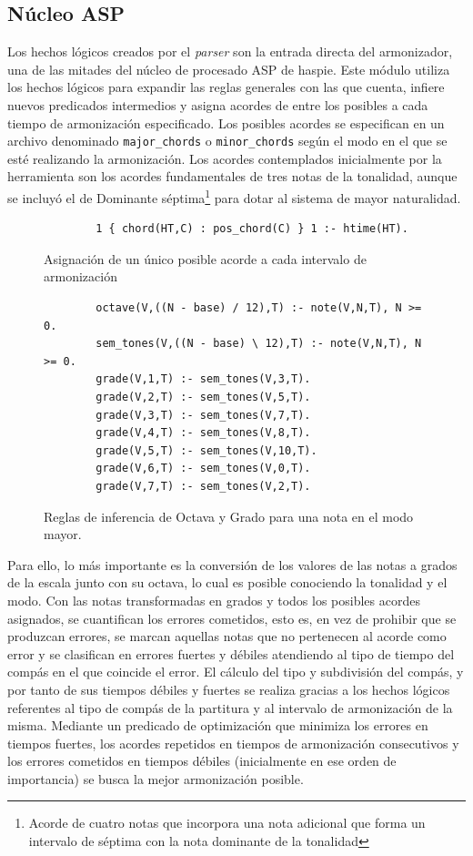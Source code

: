 \subsection{Núcleo ASP}
Los hechos lógicos creados por el \textit{parser} son la entrada directa del armonizador, una de las mitades del núcleo de procesado ASP de haspie.
Este módulo utiliza los hechos lógicos para expandir las reglas generales con las que cuenta, infiere nuevos predicados intermedios y asigna acordes de entre los posibles a cada tiempo de armonización especificado. Los posibles acordes se especifican en un archivo denominado \texttt{major\_chords} o \texttt{minor\_chords} según el modo en el que se esté realizando la armonización. Los acordes contemplados inicialmente por la herramienta son los acordes fundamentales de tres notas de la tonalidad, aunque se incluyó el de Dominante séptima\footnote{Acorde de cuatro notas que incorpora una nota adicional que forma un intervalo de séptima con la nota dominante de la tonalidad} para dotar al sistema de mayor naturalidad.

\begin{figure}
	\centering
	\begin{verbatim}
		1 { chord(HT,C) : pos_chord(C) } 1 :- htime(HT).
	\end{verbatim}
	\label{fig:chord-assig}
	\caption{Asignación de un único posible acorde a cada intervalo de armonización}
\end{figure}

\begin{figure}
	\centering
	\begin{verbatim}
		octave(V,((N - base) / 12),T) :- note(V,N,T), N >= 0.
		sem_tones(V,((N - base) \ 12),T) :- note(V,N,T), N >= 0.
		grade(V,1,T) :- sem_tones(V,3,T).
		grade(V,2,T) :- sem_tones(V,5,T).
		grade(V,3,T) :- sem_tones(V,7,T).
		grade(V,4,T) :- sem_tones(V,8,T).
		grade(V,5,T) :- sem_tones(V,10,T).
		grade(V,6,T) :- sem_tones(V,0,T).
		grade(V,7,T) :- sem_tones(V,2,T).
	\end{verbatim}
	\label{fig:grade-infer}
	\caption{Reglas de inferencia de Octava y Grado para una nota en el modo mayor.}
\end{figure}

Para ello, lo más importante es la conversión de los valores de las notas a grados de la escala junto con su octava, lo cual es posible conociendo la tonalidad y el modo. Con las notas transformadas en grados y todos los posibles acordes asignados, se cuantifican los errores cometidos, esto es, en vez de prohibir que se produzcan errores, se marcan aquellas notas que no pertenecen al acorde como error y se clasifican en errores fuertes y débiles atendiendo al tipo de tiempo del compás en el que coincide el error. El cálculo del tipo y subdivisión del compás, y por tanto de sus tiempos débiles y fuertes se realiza gracias a los hechos lógicos referentes al tipo de compás de la partitura y al intervalo de armonización de la misma.
Mediante un predicado de optimización que minimiza los errores en tiempos fuertes, los acordes repetidos en tiempos de armonización consecutivos y los errores cometidos en tiempos débiles (inicialmente en ese orden de importancia) se busca la mejor armonización posible.


